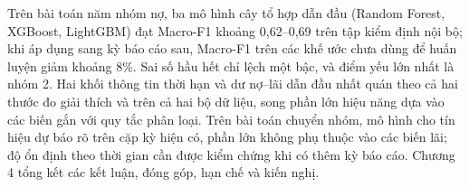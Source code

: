 Trên bài toán năm nhóm nợ, ba mô hình cây tổ hợp dẫn đầu (Random Forest, XGBoost, LightGBM) đạt Macro-F1 khoảng 0,62--0,69 trên tập kiểm định nội bộ; khi áp dụng sang kỳ báo cáo sau, Macro-F1 trên các khế ước chưa dùng để huấn luyện giảm khoảng 8\%. Sai số hầu hết chỉ lệch một bậc, và điểm yếu lớn nhất là nhóm 2. Hai khối thông tin thời hạn và dư nợ--lãi dẫn đầu nhất quán theo cả hai thước đo giải thích và trên cả hai bộ dữ liệu, song phần lớn hiệu năng dựa vào các biến gắn với quy tắc phân loại. Trên bài toán chuyển nhóm, mô hình cho tín hiệu dự báo rõ trên cặp kỳ hiện có, phần lớn không phụ thuộc vào các biến lãi; độ ổn định theo thời gian cần được kiểm chứng khi có thêm kỳ báo cáo. Chương 4 tổng kết các kết luận, đóng góp, hạn chế và kiến nghị.
